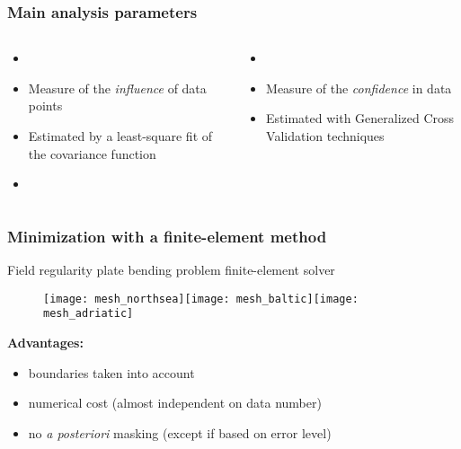 \begin{frame}
\frametitle{Main analysis parameters}

\begin{columns}[totalwidth=\textwidth]

\begin{itemize}
\footnotesize
\item[]
\item Measure of the \textit{influence} of data points
\item Estimated by a least-square fit of the covariance function
\item[]
\end{itemize}


\begin{itemize}
\footnotesize
\item[]
\item Measure of the \textit{confidence} in data 
\item Estimated with Generalized Cross Validation techniques
\end{itemize}




\end{columns}


\end{frame}


\begin{frame}
\footnotesize
\frametitle{Minimization with a finite-element method}

Field regularity \fleche plate bending problem \fleche finite-element solver

\begin{figure}[H]
\centering
\texttt{[image: mesh\_northsea]}\texttt{[image: mesh\_baltic]}\texttt{[image: mesh\_adriatic]}
\end{figure}
\textbf{Advantages:}
\begin{itemize}
\item boundaries taken into account
\item numerical cost (almost independent on data number)
\item no \textit{a posteriori} masking (except if based on error level) 
\end{itemize}

\end{frame}

